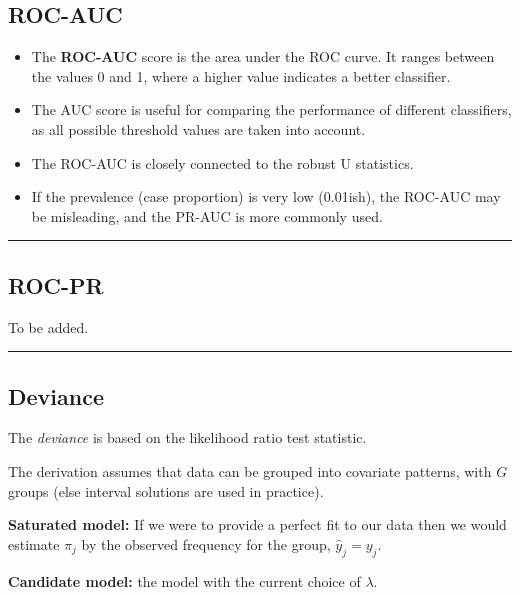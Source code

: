 \documentclass[
  letterpaper,
  DIV=11,
  numbers=noendperiod]{scrartcl}
\providecommand{\tightlist}{%
  \setlength{\itemsep}{0pt}\setlength{\parskip}{0pt}}\usepackage{longtable,booktabs,array}
\begin{document}
\hypertarget{roc-auc}{%
\subsection{ROC-AUC}\label{roc-auc}}

\begin{itemize}
\tightlist
\item
  The \textbf{ROC-AUC} score is the area under the ROC curve. It ranges
  between the values 0 and 1, where a higher value indicates a better
  classifier.
\item
  The AUC score is useful for comparing the performance of different
  classifiers, as all possible threshold values are taken into account.
\item
  The ROC-AUC is closely connected to the robust U statistics.
\item
  If the prevalence (case proportion) is very low (0.01ish), the ROC-AUC
  may be misleading, and the PR-AUC is more commonly used.
\end{itemize}

\begin{center}\rule{0.5\linewidth}{0.5pt}\end{center}

\hypertarget{roc-pr}{%
\subsection{ROC-PR}\label{roc-pr}}

To be added.

\begin{center}\rule{0.5\linewidth}{0.5pt}\end{center}

\hypertarget{deviance}{%
\subsection{Deviance}\label{deviance}}

The \emph{deviance} is based on the likelihood ratio test statistic.

The derivation assumes that data can be grouped into covariate patterns,
with \(G\) groups (else interval solutions are used in practice).

\textbf{Saturated model:} If we were to provide a perfect fit to our
data then we would estimate \(\pi_j\) by the observed frequency for the
group, \(\hat{y}_j=y_j\).

\textbf{Candidate model:} the model with the current choice of
\(\lambda\).
\end{document}
